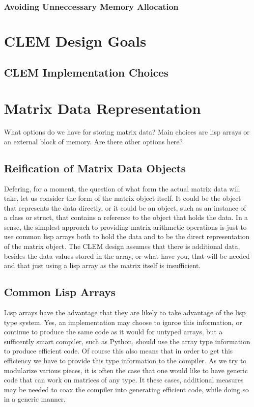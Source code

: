 \documentclass[10pt]{article}
\begin{document}
\baselineskip12pt
\subsubsection{Avoiding Unneccessary Memory Allocation}
\baselineskip14pt
\clearpage
\section{CLEM Design Goals}
\baselineskip12pt
\subsection{CLEM Implementation Choices}
\baselineskip14pt
\clearpage
\section{Matrix Data Representation}
What options do we have for storing matrix data? Main choices
     are lisp arrays or an external block of memory. Are there other
     options here?

\baselineskip12pt
\subsection{Reification of Matrix Data Objects}
\baselineskip14pt
Defering, for a moment, the question of what form the
     actual matrix data will take, let us consider the form of
     the matrix object itself. It could be the object that
     represents the data directly, or it could be an object, such
     as an instance of a class or struct, that contains a
     reference to the object that holds the data. In a sense, the
     simplest approach to providing matrix arithmetic operations
     is just to use common lisp arrays both to hold the data and
     to be the direct representation of the matrix object. The
     CLEM design assumes that there is additional data, besides
     the data values stored in the array, or what have you, that
     will be needed and that just using a lisp array as the
     matrix itself is insufficient.

\baselineskip12pt
\subsection{Common Lisp Arrays}
\baselineskip14pt
Lisp arrays have the advantage that they are likely to
     take advantage of the lisp type system. Yes, an
     implementation may choose to ignroe this information, or
     continue to produce the same code as it would for untyped
     arrays, but a sufficently smart compiler, such as Python,
     should use the array type information to produce efficient
     code. Of course this also means that in order to get this
     efficiency we have to provide this type information to the
     compiler. As we try to modularize various pieces, it is
     often the case that one would like to have generic code that
     can work on matrices of any type. It these cases, additional
     measures may be needed to coax the compiler into generating
     efficient code, while doing so in a generic manner.
\end{document}
